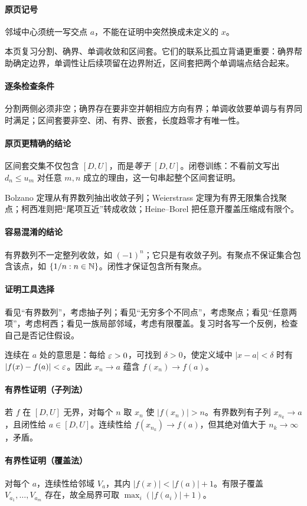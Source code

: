 \paragraph{原页记号}邻域中心须统一写交点 $a$，不能在证明中突然换成未定义的 $x$。

本页复习分割、确界、单调收敛和区间套。它们的联系比孤立背诵更重要：确界帮助确定边界，单调性让后续项留在边界附近，区间套把两个单调端点结合起来。
\paragraph{逐条检查条件}分割两侧必须非空；确界存在要非空并朝相应方向有界；单调收敛要单调与有界同时满足；区间套要非空、闭、有界、嵌套，长度趋零才有唯一性。
\paragraph{原页更精确的结论}区间套交集不仅包含 $[D,U]$，而是\emph{等于} $[D,U]$。闭卷训练：不看前文写出 $d_n\le u_m$ 对任意 $m,n$ 成立的理由，这一句串起整个区间套证明。

Bolzano 定理从有界数列抽出收敛子列；Weierstrass 定理为有界无限集合找聚点；柯西准则把“尾项互近”转成收敛；Heine--Borel 把任意开覆盖压缩成有限个。
\paragraph{容易混淆的结论}有界数列不一定整列收敛，如 $(-1)^n$；它只是有收敛子列。有聚点不保证集合包含该点，如 $\{1/n:n\in\mathbb{N}\}$。闭性才保证包含所有聚点。
\paragraph{证明工具选择}看见“有界数列”，考虑抽子列；看见“无穷多个不同点”，考虑聚点；看见“任意两项”，考虑柯西；看见一族局部邻域，考虑有限覆盖。复习时各写一个反例，检查自己是否记住假设。

连续在 $a$ 处的意思是：每给 $\varepsilon>0$，可找到 $\delta>0$，使定义域中 $|x-a|<\delta$ 时有 $|f(x)-f(a)|<\varepsilon$。因此 $x_n\to a$ 蕴含 $f(x_n)\to f(a)$。
\paragraph{有界性证明（子列法）}若 $f$ 在 $[D,U]$ 无界，对每个 $n$ 取 $x_n$ 使 $|f(x_n)|>n$。有界数列有子列 $x_{n_k}\to a$，且闭性给 $a\in[D,U]$。连续性给 $f(x_{n_k})\to f(a)$，但其绝对值大于 $n_k\to\infty$，矛盾。
\paragraph{有界性证明（覆盖法）}对每个 $a$，连续性给邻域 $V_a$，其内 $|f(x)|<|f(a)|+1$。有限子覆盖 $V_{a_1},\ldots,V_{a_m}$ 存在，故全局界可取 $\max_i(|f(a_i)|+1)$。
